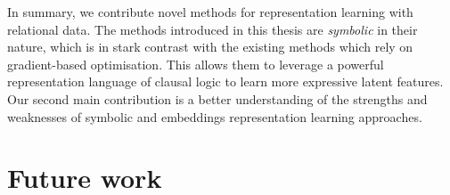 In summary, we contribute novel methods for representation learning with relational data.
The methods introduced in this thesis are \textit{symbolic} in their nature, which is in stark contrast with the existing methods which rely on gradient-based optimisation.
This allows them to leverage a powerful representation language of clausal logic to learn more expressive latent features.
Our second main contribution is a better understanding of the strengths and weaknesses of symbolic and embeddings representation learning approaches.








\section{Future work}



\cleardoublepage

